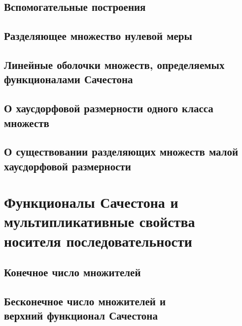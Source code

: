 \documentclass[12pt,a4paper,openbib]{report}
\theoremstyle{definition}
\begin{document}
	

	\section{Вспомогательные построения}
	

	\section{Разделяющее множество нулевой меры}
	

	\section{Линейные оболочки множеств, определяемых функционалами Сачестона}
	

	\section{О хаусдорфовой размерности одного класса множеств}
	

	\section{О существовании разделяющих множеств малой хаусдорфовой размерности}
	


\chapter{Функционалы Сачестона и мультипликативные свойства носителя последовательности}

	

	\section{Конечное число множителей}
	

	\section{Бесконечное число множителей и \\  верхний функционал Сачестона}
	
\end{document}
